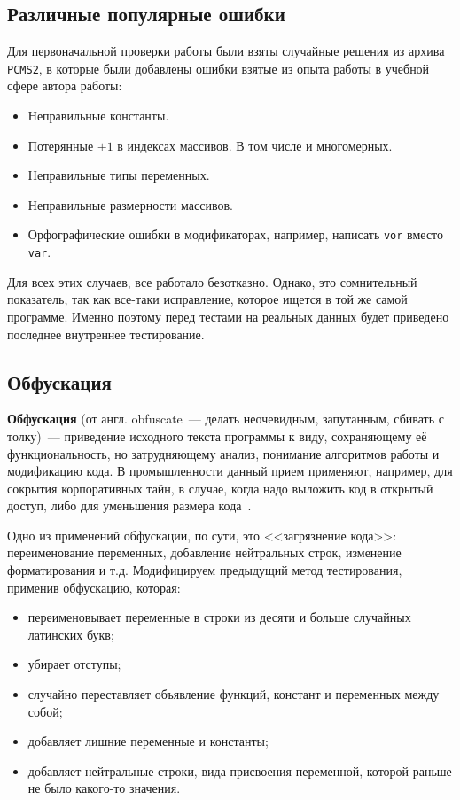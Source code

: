 \subsection{Различные популярные ошибки}
Для первоначальной проверки работы были взяты случайные решения из архива \texttt{PCMS2}, в которые были добавлены ошибки взятые из
опыта работы в учебной сфере автора работы:
\begin{itemize}
    \item Неправильные константы.
    \item Потерянные $\pm 1$ в индексах массивов. В том числе и многомерных.
    \item Неправильные типы переменных.
    \item Неправильные размерности массивов.
    \item Орфографические ошибки в модификаторах, например, написать \texttt{vor} вместо \texttt{var}.
\end{itemize} 
Для всех этих случаев, все работало безотказно. Однако, это сомнительный показатель, так как все-таки исправление, которое ищется
в той же самой программе. Именно поэтому перед тестами на реальных данных будет приведено последнее внутреннее тестирование. 
\subsection{Обфускация}
\textbf{Обфускация} (от англ. obfuscate~--- делать неочевидным, запутанным, сбивать с толку)~--- приведение исходного текста 
программы к виду, сохраняющему её функциональность, но затрудняющему анализ, понимание алгоритмов работы и модификацию кода. 
В промышленности данный прием применяют, например, для сокрытия корпоративных тайн, в случае, когда надо выложить код в открытый
доступ, либо для уменьшения размера кода~\cite{obfuscation}.

Одно из применений обфускации, по сути, это <<загрязнение кода>>: переименование переменных, добавление нейтральных строк, изменение форматирования
и т.д. Модифицируем предыдущий метод тестирования, применив обфускацию, которая:
\begin{itemize}
    \item переименовывает переменные в строки из десяти и больше случайных латинских букв;
    \item убирает отступы;
    \item случайно переставляет объявление функций, констант и переменных между собой;
    \item добавляет лишние переменные и константы;
    \item добавляет нейтральные строки, вида присвоения переменной, которой раньше не было какого-то значения.
\end{itemize} 

